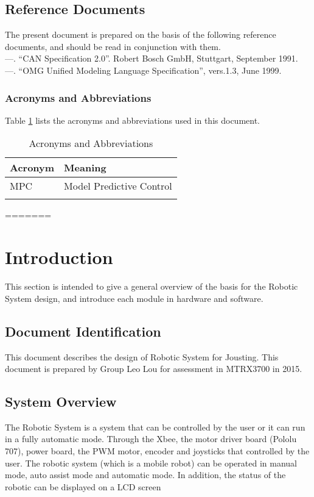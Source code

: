 \documentclass[MTRX3700report.tex]{subfiles}
\begin{document}
\subsection{Reference Documents}
  The present document is prepared on the basis of the following reference documents, and should be read in conjunction with them.\\
  —.  “CAN Specification 2.0”.  Robert Bosch GmbH, Stuttgart, September 1991.\\
  —.  “OMG Unified Modeling Language Specification”, vers.1.3, June 1999.

\subsubsection{Acronyms and Abbreviations}
  Table \ref{Acro} lists the acronyms and abbreviations used in this document.
  \begin{table}[h]
  \centering
  \caption{Acronyms and Abbreviations}
  \label{Acro}
  \begin{tabular}{|l|l|}
  \hline Acronym & Meaning \\
  \hline MPC & Model Predictive Control \\
  \hline & \\
  \hline
  \end{tabular}
  \end{table}
=======
\section{Introduction}
This section is intended to give a general overview of the basis for the Robotic System design, and introduce each module in hardware and software.
\subsection{Document Identification}
This document describes the design of Robotic System for Jousting. This document is prepared by Group Leo Lou for assessment in MTRX3700 in 2015.
\subsection{System Overview}
The Robotic System is a system that can be controlled by the user or it can run in a fully automatic mode. Through the Xbee, the motor driver board (Pololu 707), power board, the PWM motor, encoder and joysticks that controlled by the user. The robotic system (which is a mobile robot) can be operated in manual mode, auto assist mode and automatic mode. In addition, the status of the robotic can be displayed on a LCD screen
\end{document}
